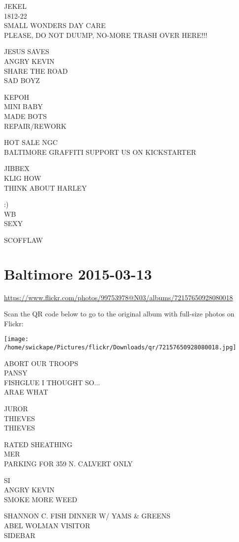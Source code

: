 \documentclass[10pt,letterpaper]{article}
\begin{document}
JEKEL\\
1812{-}22\\
SMALL WONDERS DAY CARE\\
PLEASE, DO NOT DUUMP, NO{-}MORE TRASH OVER HERE!!!

JESUS SAVES\\
ANGRY KEVIN\\
SHARE THE ROAD\\
SAD BOYZ

KEPOH\\
MINI BABY\\
MADE BOTS\\
REPAIR/REWORK

HOT SALE NGC\\
BALTIMORE GRAFFITI SUPPORT US ON KICKSTARTER

JIBBEX\\
KLIG HOW\\
THINK ABOUT HARLEY

:)\\
WB\\
SEXY

SCOFFLAW
\pagebreak

\section*{Baltimore 2015-03-13}

\url{https://www.flickr.com/photos/99753978@N03/albums/72157650928080018}

Scan the QR code below to go to the original album with full-size photos on Flickr:

\texttt{[image: /home/swickape/Pictures/flickr/Downloads/qr/72157650928080018.jpg]}
\pagebreak

ABORT OUR TROOPS\\
PANSY\\
FISHGLUE I THOUGHT SO...\\
ARAE WHAT

JUROR\\
THIEVES\\
THIEVES

RATED SHEATHING\\
MER\\
PARKING FOR 359 N. CALVERT ONLY

SI\\
ANGRY KEVIN\\
SMOKE MORE WEED

SHANNON C. FISH DINNER W/ YAMS \& GREENS\\
ABEL WOLMAN VISITOR\\
SIDEBAR
\end{document}
